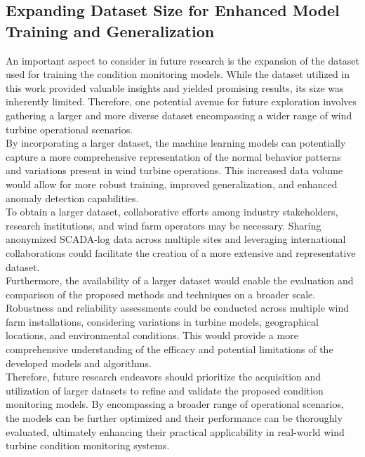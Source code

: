 \subsection{Expanding Dataset Size for Enhanced Model Training and Generalization}

An important aspect to consider in future research is the expansion of the dataset used for training the condition monitoring models. 
While the dataset utilized in this work provided valuable insights and yielded promising results, its size was inherently limited. 
Therefore, one potential avenue for future exploration involves gathering a larger and more diverse dataset encompassing a wider range of wind turbine operational scenarios. \\

By incorporating a larger dataset, the machine learning models can potentially capture a more comprehensive representation of the normal behavior patterns and variations present in wind turbine operations. 
This increased data volume would allow for more robust training, improved generalization, and enhanced anomaly detection capabilities. \\

To obtain a larger dataset, collaborative efforts among industry stakeholders, research institutions, and wind farm operators may be necessary. 
Sharing anonymized SCADA-log data across multiple sites and leveraging international collaborations could facilitate the creation of a more extensive and representative dataset. \\

Furthermore, the availability of a larger dataset would enable the evaluation and comparison of the proposed methods and techniques on a broader scale. 
Robustness and reliability assessments could be conducted across multiple wind farm installations, considering variations in turbine models, geographical locations, and environmental conditions. 
This would provide a more comprehensive understanding of the efficacy and potential limitations of the developed models and algorithms. \\

Therefore, future research endeavors should prioritize the acquisition and utilization of larger datasets to refine and validate the proposed condition monitoring models. 
By encompassing a broader range of operational scenarios, the models can be further optimized and their performance can be thoroughly evaluated, ultimately enhancing their practical applicability in real-world wind turbine condition monitoring systems.

